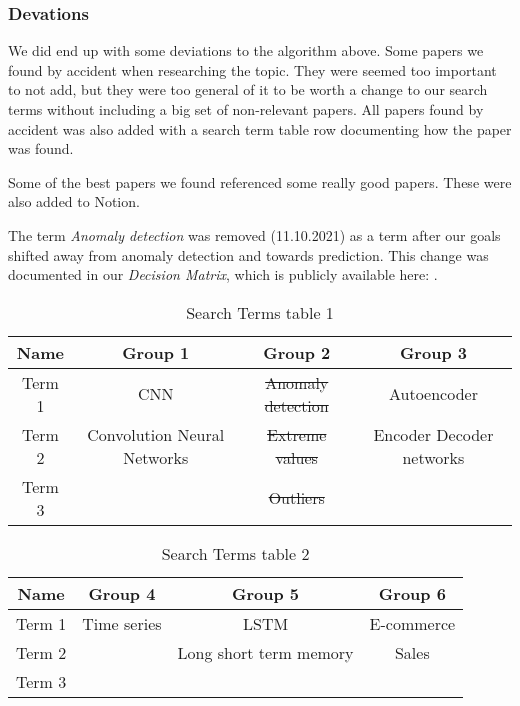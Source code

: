 \subsubsection{Devations}
We did end up with some deviations to the algorithm above.
Some papers we found by accident when researching the topic. 
They were seemed too important to not add, but they were too general of it to be worth
a change to our search terms without including a big set of non-relevant papers.
All papers found by accident was also added with a search term table row documenting 
how the paper was found.

Some of the best papers we found referenced some really good papers. These were also 
added to Notion.

The term \textit{Anomaly detection} was removed (11.10.2021) as a term after our goals shifted away from anomaly detection and towards prediction.
This change was documented in our \textit{Decision Matrix}, which is publicly available here:
\cite{decisionmatrix}.

\begin{table}[htbp]
    \begin{center}
        \begin{tabular}{|c|c|c|c|}\hline\hline
Name&Group 1&Group 2&Group 3\\ \hline
Term 1&CNN&\sout{Anomaly detection}&Autoencoder\\ \hline
Term 2&Convolution Neural Networks&\sout{Extreme values}&Encoder Decoder networks\\ \hline
Term 3&&\sout{Outliers}&  \\ \hline
        \end{tabular}
        \caption{Search Terms table 1}
        \label{tab:search-terms-table-1}
    \end{center}
\end{table}%

\begin{table}[htbp]
    \begin{center}
        \begin{tabular}{|c|c|c|c|}\hline\hline
Name &Group 4&Group 5&Group 6 \\ \hline
Term 1&Time series&LSTM&E-commerce \\ \hline
Term 2 &&Long short term memory&Sales \\ \hline
Term 3& &&\\ \hline 
        \end{tabular}
        \caption{Search Terms table 2}
    \label{tab:search-terms-table-2}
    \end{center}
\end{table}%


